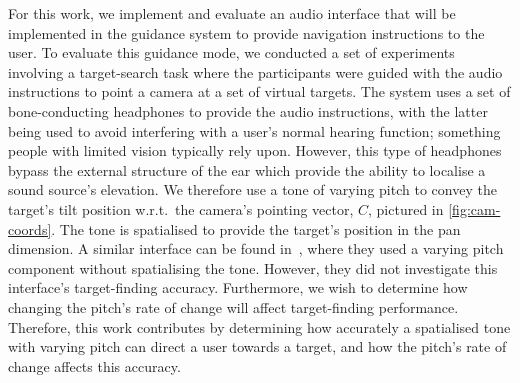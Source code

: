 \documentclass[sigconf, screen=true, anonymous=true]{acmart}
\begin{document}
For this work, we implement and evaluate an audio interface that will be implemented in the guidance system to provide navigation instructions to the user. 
To evaluate this guidance mode, we conducted a set of experiments involving a target-search task where the participants were guided with the audio instructions to point a camera at a set of virtual targets.
The system uses a set of bone-conducting headphones to provide the audio instructions, with the latter being used to avoid interfering with a user's normal hearing function; something people with limited vision typically rely upon. 
However, this type of headphones bypass the external structure of the ear which provide the ability to localise a sound source's elevation.
We therefore use a tone of varying pitch to convey the target's tilt position w.r.t.\ the camera's pointing vector, $C$, pictured in \cref{fig:cam-coords}.
The tone is spatialised to provide the target's position in the pan dimension.
A similar interface can be found in~\cite{durette2008visuo}, where they used a varying pitch component without spatialising the tone. 
However, they did not investigate this interface's target-finding accuracy.
Furthermore, we wish to determine how changing the pitch's rate of change will affect target-finding performance. 
Therefore, this work contributes by determining how accurately a spatialised tone with varying pitch can direct a user towards a target, and how the pitch's rate of change affects this accuracy.

\end{document}
